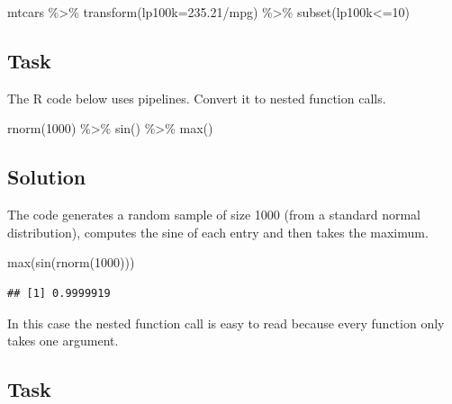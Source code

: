 \documentclass[
]{book}
\newenvironment{Shaded}{\begin{snugshade}}{\end{snugshade}}
\newcommand{\AttributeTok}[1]{\textcolor[rgb]{0.77,0.63,0.00}{#1}}
\newcommand{\DecValTok}[1]{\textcolor[rgb]{0.00,0.00,0.81}{#1}}
\newcommand{\FloatTok}[1]{\textcolor[rgb]{0.00,0.00,0.81}{#1}}
\newcommand{\FunctionTok}[1]{\textcolor[rgb]{0.00,0.00,0.00}{#1}}
\newcommand{\NormalTok}[1]{#1}
\newcommand{\SpecialCharTok}[1]{\textcolor[rgb]{0.00,0.00,0.00}{#1}}
\begin{document}
\begin{Shaded}
\begin{Highlighting}[]
\NormalTok{mtcars }\SpecialCharTok{\%\textgreater{}\%}
  \FunctionTok{transform}\NormalTok{(}\AttributeTok{lp100k=}\FloatTok{235.21}\SpecialCharTok{/}\NormalTok{mpg) }\SpecialCharTok{\%\textgreater{}\%}
  \FunctionTok{subset}\NormalTok{(lp100k}\SpecialCharTok{\textless{}=}\DecValTok{10}\NormalTok{)}
\end{Highlighting}
\end{Shaded}

\hypertarget{task}{%
\subsection{Task}\label{task}}

The R code below uses pipelines. Convert it to nested function calls.

\begin{Shaded}
\begin{Highlighting}[]
\FunctionTok{rnorm}\NormalTok{(}\DecValTok{1000}\NormalTok{) }\SpecialCharTok{\%\textgreater{}\%} \FunctionTok{sin}\NormalTok{() }\SpecialCharTok{\%\textgreater{}\%} \FunctionTok{max}\NormalTok{()}
\end{Highlighting}
\end{Shaded}

\hypertarget{solution}{%
\subsection{Solution}\label{solution}}

The code generates a random sample of size 1000 (from a standard normal distribution), computes the sine of each entry and then takes the maximum.

\begin{Shaded}
\begin{Highlighting}[]
\FunctionTok{max}\NormalTok{(}\FunctionTok{sin}\NormalTok{(}\FunctionTok{rnorm}\NormalTok{(}\DecValTok{1000}\NormalTok{)))}
\end{Highlighting}
\end{Shaded}

\begin{verbatim}
## [1] 0.9999919
\end{verbatim}

In this case the nested function call is easy to read because every function only takes one argument.

\hypertarget{task-1}{%
\subsection{Task}\label{task-1}}
\end{document}
